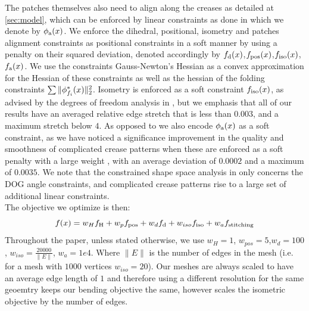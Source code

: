 The patches themselves also need to align along the creases as detailed at \ref{sec:model}, which can be enforced by linear constraints as done in \cite{rabi2018shape} which we denote by $\phi_\text{a}(x)$. We enforce the dihedral, positional, isometry and patches alignment constraints as positional constraints in a soft manner by using a penalty on their squared deviation, denoted accordingly by $f_\text{d}(x)$,$f_\text{pos}(x)$,$f_\text{iso}(x)$,$f_\text{a}(x)$. We use the constraints Gauss-Newton's Hessian as a convex approximation for the Hessian of these constraints as well as the hessian of the folding constraints  $\sum \|\phi^*_{f_i}(x)\|_2^2$. Isometry is enforced as a soft constraint $f_\text{iso}(x)$, as advised by the degrees of freedom analysis in \cite{rabi18,rabi2018shape}, but we emphasis that all of our results have an averaged relative edge stretch that is less than $0.003$, and a maximum stretch below $4$. As opposed to \cite{rabi2018shape} we also encode  $\phi_\text{a}(x)$ as a soft constraint, as we have noticed a significance improvement in the quality and smoothness of complicated crease patterns when these are enforced as a soft penalty with a large weight ,  with an average deviation of $0.0002$ and a maximum of $0.0035$. We note that the constrained shape space analysis in \cite{rabi2018shape} only concerns the DOG angle constraints, and complicated crease patterns rise to a large set of additional linear constraints.\\ 
The objective we optimize is then:
\begin{equation}
f(x) = w_Hf_\text{H}+w_pf_\text{pos}+w_df_\text{d}+w_{iso}f_\text{iso}+w_af_\text{stitching}
\end{equation}
Throughout the paper, unless stated otherwise, we use $w_H = 1$, $w_{pos}=5$,$w_d = 100$, $w_{iso}= \frac{20000}{\|E\|}$, $w_a = 1e4$. Where $\|E\|$ is the number of edges in the mesh (i.e. for a mesh with $1000$ vertices $w_{iso}=20$). Our meshes are always scaled to have an average edge length of $1$ and therefore using a different resolution for the same geoemtry keeps our bending objective the same, however scales the isometric objective by the number of edges.